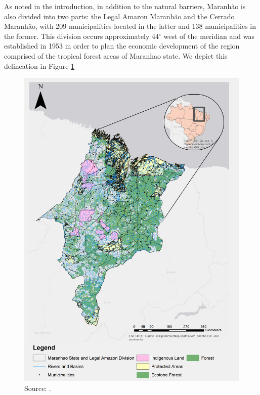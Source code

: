As noted in the introduction, in addition to the natural barriers, Maranhão is also divided into two parts: the Legal Amazon Maranhão and the Cerrado Maranhão, with 209 municipalities located in the latter and 138 municipalities in the former. This division occurs approximately 44$^{\circ}$ west of the meridian and was established in 1953 in order to plan the economic development of the region comprised of the tropical forest areas of Maranhao state.  We depict this delineation in Figure \ref{fig:delimitacao}

\begin{figure}[H]
  \centering
  \includegraphics[width=1\textwidth, inner]{MaranhaoChapter2_Fig1.png}
\caption{Source: \citep{MMMAwebsite,nugeo_2018,embrapa_2018}.}
\label{fig:delimitacao}
\end{figure}



